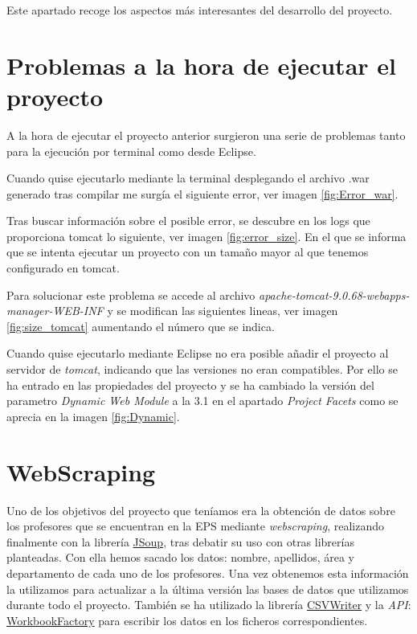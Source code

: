 
Este apartado recoge los aspectos más interesantes del desarrollo del proyecto.

\section{Problemas a la hora de ejecutar el proyecto}

A la hora de ejecutar el proyecto anterior surgieron una serie de problemas tanto para la ejecución por terminal como desde Eclipse.

Cuando quise ejecutarlo mediante la terminal desplegando el archivo .war generado tras compilar me surgía el siguiente error, ver imagen \ref{fig:Error_war}.


Tras buscar información sobre el posible error, se descubre en los logs que proporciona tomcat lo siguiente, ver imagen \ref{fig:error_size}. En el que se informa que se intenta ejecutar un proyecto con un tamaño mayor al que tenemos configurado en tomcat.


Para solucionar este problema se accede al archivo \emph{apache-tomcat-9.0.68-webapps-manager-WEB-INF} y se modifican las siguientes lineas, ver imagen \ref{fig:size_tomcat} aumentando el número que se indica.


Cuando quise ejecutarlo mediante Eclipse no era posible añadir el proyecto al servidor de \emph{tomcat}, indicando que las versiones no eran compatibles. Por ello se ha entrado en las propiedades del proyecto y se ha cambiado la versión del parametro \emph{Dynamic Web Module} a la 3.1 en el apartado \emph{Project Facets} como se aprecia en la imagen \ref{fig:Dynamic}.


\section{WebScraping}

Uno de los objetivos del proyecto que teníamos era la obtención de datos sobre los profesores que se encuentran en la EPS mediante \emph{webscraping}, realizando finalmente con la librería \href{https://jsoup.org/}{JSoup}, tras debatir su uso con otras librerías planteadas. 
Con ella hemos sacado los datos: nombre, apellidos, área y departamento de cada uno de los profesores. Una vez obtenemos esta información la utilizamos para actualizar a la última versión las bases de datos que utilizamos durante todo el proyecto.
También se ha utilizado la librería \href{https://opencsv.sourceforge.net/apidocs/com/opencsv/CSVWriter.html}{CSVWriter} y la \emph{API}: \href{https://poi.apache.org/apidocs/dev/org/apache/poi/ss/usermodel/WorkbookFactory.html}{WorkbookFactory} para escribir los datos en los ficheros correspondientes.

